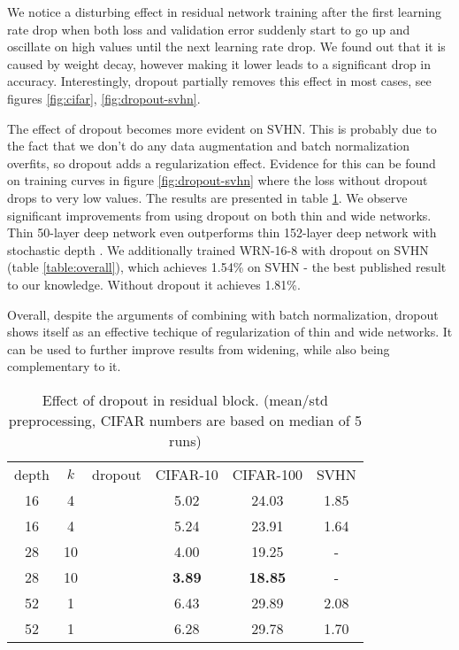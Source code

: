 \documentclass{bmvc2k}
\begin{document}
We notice a disturbing effect in residual network training after the first learning rate drop when both loss and validation error suddenly start to go up and oscillate on high values until the next learning rate drop. We found out that it is caused by weight decay, however making it lower leads to a significant drop in accuracy. Interestingly, dropout partially removes this effect in most cases, see figures \ref{fig:cifar}, \ref{fig:dropout-svhn}.

The effect of dropout becomes more evident on SVHN. This is probably due to the fact that we don't do any data augmentation and batch normalization overfits, so dropout adds a regularization effect. Evidence for this can be found on training curves in figure \ref{fig:dropout-svhn} where the loss without dropout drops to very low values. The results are presented in  table \ref{table:dropout}. We observe significant improvements from using dropout on both thin and wide networks. Thin 50-layer deep network even outperforms thin 152-layer deep network with stochastic depth \cite{stochastic_depth}. We additionally trained WRN-16-8 with dropout on SVHN (table \ref{table:overall}), which achieves 1.54\% on SVHN - the best published result to our knowledge. Without dropout it  achieves 1.81\%.

Overall, despite the arguments of combining with batch normalization, dropout shows itself as an effective techique of regularization of thin and wide networks. It can be used to further improve results from widening, while also being complementary to it.

\newcommand{\chk}{{\centering\checkmark}}
\begin{table}
  \centering
  \begin{tabular}{c|c|c|c|c|c}
    \hline
     depth & $k$ & dropout & CIFAR-10 & CIFAR-100 & SVHN \\
    \Xhline{2\arrayrulewidth}
16 &     4 &      &     5.02 &   24.03 &         1.85\\
16 &     4 &     \chk & 5.24 &   23.91 &         1.64\\
28 &     10 &     &     4.00 &   19.25 & -\\
28 &     10 &    \chk & \textbf{3.89} &   \textbf{18.85} & -\\
52 &     1 &      &     6.43 &   29.89 &         2.08\\
52 &     1 &     \chk & 6.28 &   29.78 &         1.70\\
    \hline
  \end{tabular}
  \vspace{0.1cm}
  \caption{Effect of dropout in residual block. (mean/std preprocessing, CIFAR numbers are based on median of 5 runs)}
  \label{table:dropout}
\end{table}
\end{document}
